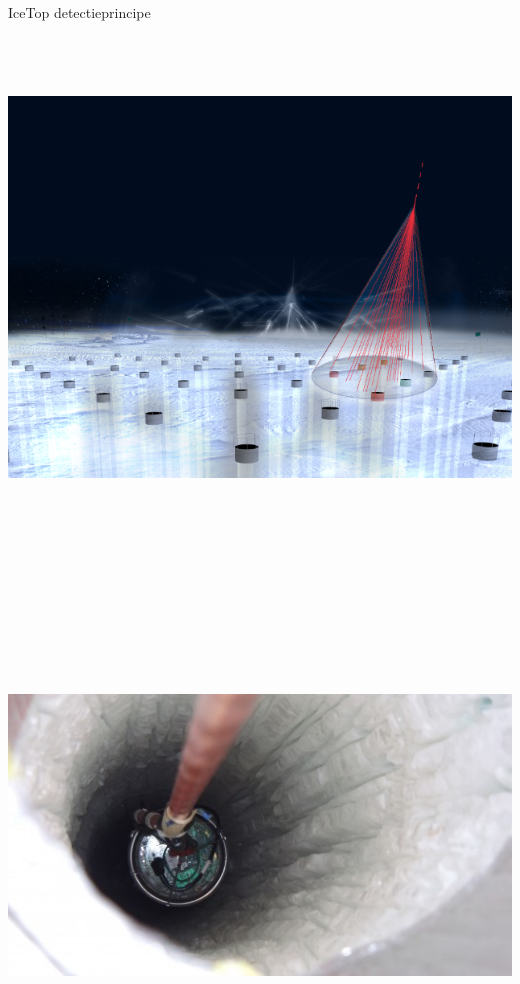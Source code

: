\Tr
\begin{center}
{\blue IceTop detectieprincipe}\\[5mm] 
\includegraphics[keepaspectratio,height=14cm]{cr-shower2}
\end{center}

\Tr
\begin{center}
\includegraphics[keepaspectratio,height=14cm]{hole2}
\end{center}

